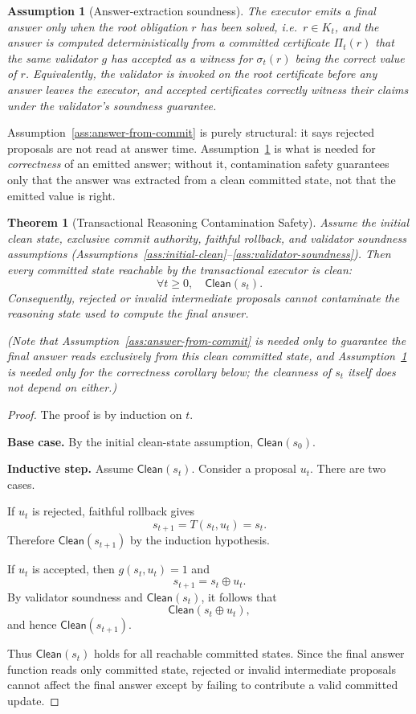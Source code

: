 \documentclass[11pt]{article}
\newtheorem{assumption}{Assumption}
\newtheorem{theorem}{Theorem}
\newcommand{\Clean}{\mathsf{Clean}}
\begin{document}
\begin{assumption}[Answer-extraction soundness]
\label{ass:answer-extraction}
The executor emits a final answer only when the root obligation $r$ has been
solved, i.e.\ $r\in K_t$, and the answer is computed deterministically from
a committed certificate $\Pi_t(r)$ that the same validator $g$ has accepted
as a witness for $\sigma_t(r)$ being the correct value of $r$. Equivalently,
the validator is invoked on the root certificate before any answer leaves
the executor, and accepted certificates correctly witness their claims under
the validator's soundness guarantee.
\end{assumption}

Assumption~\ref{ass:answer-from-commit} is purely structural: it says rejected
proposals are not read at answer time. Assumption~\ref{ass:answer-extraction}
is what is needed for \emph{correctness} of an emitted answer; without it,
contamination safety guarantees only that the answer was extracted from a
clean committed state, not that the emitted value is right.

\begin{theorem}[Transactional Reasoning Contamination Safety]
\label{thm:contamination-safety}
Assume the initial clean state, exclusive commit authority, faithful
rollback, and validator soundness assumptions
(Assumptions~\ref{ass:initial-clean}--\ref{ass:validator-soundness}). Then
every committed state reachable by the transactional executor is clean:
\[
\forall t \ge 0,\quad \Clean(s_t).
\]
Consequently, rejected or invalid intermediate proposals cannot contaminate
the reasoning state used to compute the final answer.

(Note that Assumption~\ref{ass:answer-from-commit} is needed only to
guarantee the final answer reads exclusively from this clean committed
state, and Assumption~\ref{ass:answer-extraction} is needed only for the
correctness corollary below; the cleanness of $s_t$ itself does not depend
on either.)
\end{theorem}

\begin{proof}
The proof is by induction on $t$.

\textbf{Base case.} By the initial clean-state assumption, $\Clean(s_0)$.

\textbf{Inductive step.} Assume $\Clean(s_t)$. Consider a proposal $u_t$.
There are two cases.

If $u_t$ is rejected, faithful rollback gives
\[
s_{t+1}=T(s_t,u_t)=s_t.
\]
Therefore $\Clean(s_{t+1})$ by the induction hypothesis.

If $u_t$ is accepted, then $g(s_t,u_t)=1$ and
\[
s_{t+1}=s_t\oplus u_t.
\]
By validator soundness and $\Clean(s_t)$, it follows that
\[
\Clean(s_t\oplus u_t),
\]
and hence $\Clean(s_{t+1})$.

Thus $\Clean(s_t)$ holds for all reachable committed states. Since the final
answer function reads only committed state, rejected or invalid intermediate
proposals cannot affect the final answer except by failing to contribute a valid
committed update.
\end{proof}
\end{document}
